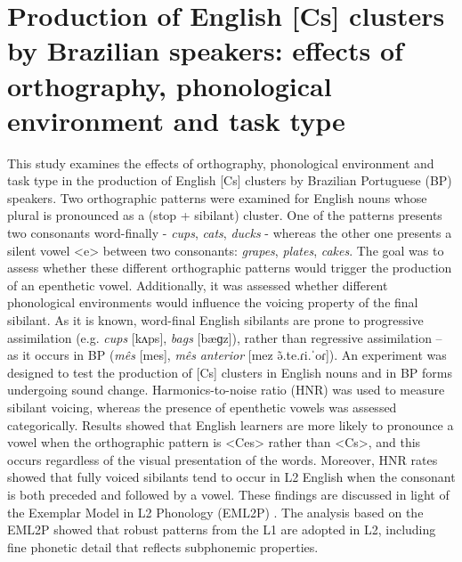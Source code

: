 \chapter{Production of English [Cs] clusters by Brazilian speakers: effects of orthography, phonological environment and task type}
\label{ch:wellingtonara4}
\begin{affils}
\end{affils}

This study examines the effects of orthography, phonological environment
and task type in the production of English {[}Cs{]} clusters by
Brazilian Portuguese (BP) speakers. Two orthographic patterns were
examined for English nouns whose plural is pronounced as a (stop +
sibilant) cluster. One of the patterns presents two consonants
word-finally - \emph{cups}, \emph{cats}, \emph{ducks} - whereas the
other one presents a silent vowel \textless{}e\textgreater{} between two
consonants: \emph{grapes}, \emph{plates}, \emph{cakes}. The goal was to
assess whether these different orthographic patterns would trigger the
production of an epenthetic vowel. Additionally, it was assessed whether
different phonological environments would influence the voicing property
of the final sibilant. As it is known, word-final English sibilants are
prone to progressive assimilation (e.g. \emph{cups} {[}kʌps{]},
\emph{bags} {[}bæɡz{]}), rather than regressive assimilation -- as it
occurs in BP (\emph{mês} {[}mes{]}, \emph{mês} \emph{anterior} {[}mez
ə̃.te.ɾi.ˈoɾ{]}). An experiment was designed to test the production of
{[}Cs{]} clusters in English nouns and in BP forms undergoing sound
change. Harmonics-to-noise ratio (HNR) was used to measure sibilant
voicing, whereas the presence of epenthetic vowels was assessed
categorically. Results showed that English learners are more likely to
pronounce a vowel when the orthographic pattern is
\textless{}Ces\textgreater{} rather than \textless{}Cs\textgreater{}, and
this occurs regardless of the visual presentation of the words.
Moreover, HNR rates showed that fully voiced sibilants tend to occur in
L2 English when the consonant is both preceded and followed by a vowel.
These findings are discussed in light of the Exemplar Model in L2
Phonology (EML2P) \citep{guimaraes2021,mendesjr2022}. The
analysis based on the EML2P showed that robust patterns from the L1 are
adopted in L2, including fine phonetic detail that reflects subphonemic
properties.

